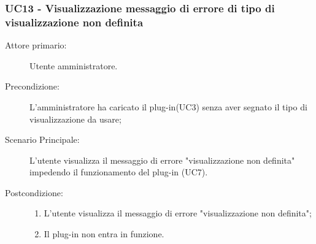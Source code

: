 \subsubsection{UC13 - Visualizzazione messaggio di errore di tipo di visualizzazione non definita}
\label{sssec:uc13}
\begin{description}
	\item[Attore primario:] Utente amministratore.
	\item[Precondizione:] L'amministratore ha caricato il plug-in(UC3) senza aver segnato il tipo di visualizzazione da usare;
	\item[Scenario Principale:] L'utente visualizza il messaggio di errore "visualizzazione non definita" impedendo il funzionamento del plug-in (UC7).
	\item[Postcondizione:]
	\begin{enumerate}
		\item L'utente visualizza il messaggio di errore "visualizzazione non definita";
		\item Il plug-in non entra in funzione.
	\end{enumerate}
\end{description}